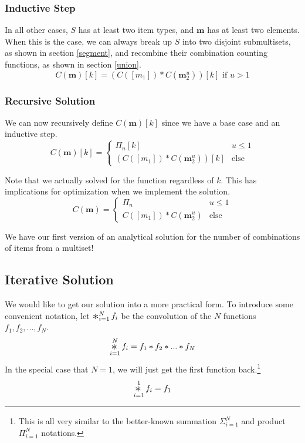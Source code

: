 \documentclass{article}
\newcommand{\Conv}{\mathop{\scalebox{1.5}{\raisebox{-0.2ex}{$\ast$}}}}%
\begin{document}
\subsubsection{Inductive Step}

In all other cases, $S$ has at least two item types, and $\bm{m}$ has at least two elements. When this is the case, we can always break up $S$ into two disjoint submultisets, as shown in section \ref{segment}, and recombine their combination counting functions, as shown in section \ref{union}.
\begin{equation}
    C(\bm{m})[k] = (C([m_1]) * C(\bm{m}_2^u))[k]\text{ if } u>1
\end{equation}

\subsubsection{Recursive Solution}

We can now recursively define $C(\bm{m})[k]$ since we have a base case and an inductive step.
\begin{equation}
    C(\bm{m})[k] = \begin{cases}\Pi_n[k] & u \leq 1 \\
    (C([m_1]) * C(\bm{m}_2^u))[k] & \text{else} \end{cases}
\end{equation}

Note that we actually solved for the function regardless of $k$. This has implications for optimization when we implement the solution. \begin{equation} \label{rec}
    C(\bm{m}) = \begin{cases}\Pi_n & u \leq 1 \\
    C([m_1]) * C(\bm{m}_2^u) & \text{else} \end{cases}
\end{equation}

We have our first version of an analytical solution for the number of combinations of items from a multiset!

\subsection{Iterative Solution}

We would like to get our solution into a more practical form. To introduce some convenient notation, let $\Conv_{i=1}^N f_i$ be the convolution of the $N$ functions $f_1, f_2, ..., f_N$. 
\begin{equation}
    \Conv_{i=1}^N f_i = f_1 * f_2 * ... * f_N
\end{equation}
In the special case that $N=1$, we will just get the first function back.\footnote{This is all very similar to the better-known summation $\Sigma_{i=1}^N$ and product $\Pi_{i=1}^N$ notations.}
\begin{equation}
    \Conv_{i=1}^1 f_i = f_1
\end{equation}
\end{document}
